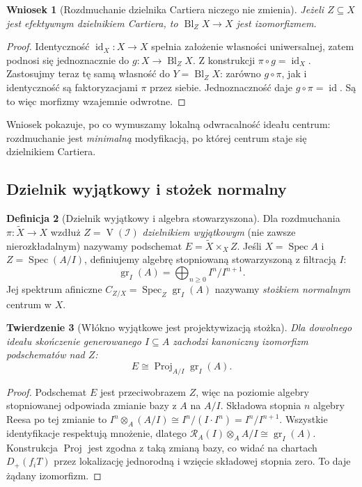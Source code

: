 \documentclass[11pt,a4paper,openany]{report}
\numberwithin{equation}{section}
\theoremstyle{plain}
\newtheorem{twierdzenie}{Twierdzenie}[section]
\newtheorem{wniosek}[twierdzenie]{Wniosek}
\theoremstyle{definition}
\newtheorem{definicja}[twierdzenie]{Definicja}
\theoremstyle{remark}
\newcommand{\V}{\operatorname V}
\newcommand{\id}{\operatorname{id}}
\newcommand{\Spec}{\operatorname{Spec}}
\begin{document}
\begin{wniosek}[Rozdmuchanie dzielnika Cartiera niczego nie zmienia]
\label{wn:ga5-cartier-trivial}
Jeżeli $Z\subseteq X$ jest efektywnym dzielnikiem
Cartiera, to $\operatorname{Bl}_Z X\to X$ jest izomorfizmem.
\end{wniosek}
\begin{proof}
Identyczność $\id_X:X\to X$ spełnia założenie własności
uniwersalnej, zatem podnosi się jednoznacznie do
$g:X\to\operatorname{Bl}_Z X$. Z konstrukcji
$\pi\circ g=\id_X$. Zastosujmy teraz tę samą własność
do $Y=\operatorname{Bl}_Z X$: zarówno $g\circ\pi$,
jak i identyczność są faktoryzacjami $\pi$ przez siebie.
Jednoznaczność daje $g\circ\pi=\id$. Są to więc
morfizmy wzajemnie odwrotne.
\end{proof}

Wniosek pokazuje, po co wymuszamy lokalną odwracalność
ideału centrum: rozdmuchanie jest \emph{minimalną}
modyfikacją, po której centrum staje się dzielnikiem Cartiera.

\subsection{Dzielnik wyjątkowy i stożek normalny}

\begin{definicja}[Dzielnik wyjątkowy i algebra stowarzyszona]
Dla rozdmuchania $\pi:\widetilde X\to X$ wzdłuż
$Z=\V(\mathcal I)$ \emph{dzielnikiem wyjątkowym}
(nie zawsze nierozkładalnym) nazywamy podschemat
$E=\widetilde X\times_X Z$.
Jeśli $X=\Spec A$ i $Z=\Spec(A/I)$, definiujemy
algebrę stopniowaną stowarzyszoną z filtracją $I$:
\[
 \operatorname{gr}_I(A)=\bigoplus_{n\ge0}I^n/I^{n+1}.
\]
Jej spektrum afiniczne
$C_{Z/X}=\Spec_Z\operatorname{gr}_I(A)$
nazywamy \emph{stożkiem normalnym} centrum w $X$.
\end{definicja}

\begin{twierdzenie}[Włókno wyjątkowe jest projektywizacją stożka]
\label{tw:ga5-normalcone}
Dla dowolnego ideału skończenie generowanego $I\subseteq A$
zachodzi kanoniczny izomorfizm podschematów nad $Z$:
\[
 E\cong\operatorname{Proj}_{A/I}\operatorname{gr}_I(A).
\]
\end{twierdzenie}
\begin{proof}
Podschemat $E$ jest przeciwobrazem $Z$, więc na poziomie
algebry stopniowanej odpowiada zmianie bazy z $A$ na
$A/I$. Składowa stopnia $n$ algebry Reesa po tej
zmianie to
$I^n\otimes_A(A/I)\cong I^n/(I\cdot I^n)=I^n/I^{n+1}$.
Wszystkie identyfikacje respektują mnożenie, dlatego
$\mathcal R_A(I)\otimes_A A/I\cong\operatorname{gr}_I(A)$.
Konstrukcja $\operatorname{Proj}$ jest zgodna z taką
zmianą bazy, co widać na chartach
$D_+(f_iT)$ przez lokalizację jednorodną i wzięcie
składowej stopnia zero. To daje żądany izomorfizm.
\end{proof}
\end{document}

